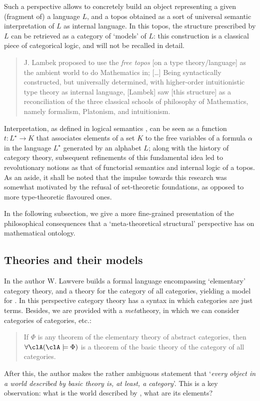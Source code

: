 Such a perspective allows to concretely build an object representing a given (fragment of) a language $L$, and a topos obtained as a sort of universal semantic interpretation of $L$ as internal language. In this topos, the structure prescribed by $L$ can be retrieved as a category of `models' of $L$: this construction is a classical piece of categorical logic, and will not be recalled in detail.%
\begin{quote}
	J. Lambek proposed to use the \emph{free topos} [on a type theory/language] as the ambient world to do Mathematics in; [\dots\unkern] Being syntactically constructed, but universally determined, with higher-order intuitionistic type theory as internal language, [Lambek] saw [this structure] as a reconciliation of the three classical schools of philosophy of Mathematics, namely formalism, Platonism, and intuitionism. \hfill\cite{free_topos}
\end{quote}
Interpretation, as defined in logical semantics \cite{gamut1991logic}, can be seen as a function $t: L^\star \to K$ that associates elements of a set $K$ to the free variables of a formula $\alpha$ in the language $L^\star$ generated by an alphabet $L$; along with the history of category theory, subsequent refinements of this fundamental idea led to revolutionary notions as that of functorial semantics and internal logic of a topos.
As an aside, it shall be noted that the impulse towards this research was somewhat motivated by the refusal of set-theoretic foundations, as opposed to more type-theoretic flavoured ones.

In the following subsection, we give a more fine-grained presentation of the philosophical consequences that a `meta\hyp{}theoretical structural' perspective has on mathematical ontology.
\subsection{Theories and their models}
In \cite{lajolla} the author W. Lawvere builds a formal language  encompassing `elementary' category theory, and a theory  for the category of all categories, yielding a model for . In this perspective category theory has a syntax in which categories are just terms. Besides, we are provided with a \emph{meta}theory, in which we can consider categories of categories, etc.:
\begin{quote}
	If $\Phi$ is any theorem of the elementary theory of abstract categories, then $\forall \clA (\clA \models \Phi)$ is a theorem of the basic theory of the category of all categories. \hfill \cite{lajolla}
\end{quote}
After this, the author makes the rather ambiguous statement that `\textit{every object in a world described by basic theory is, at least, a category}'. This is a key observation: what is the world described by , what are its elements?

